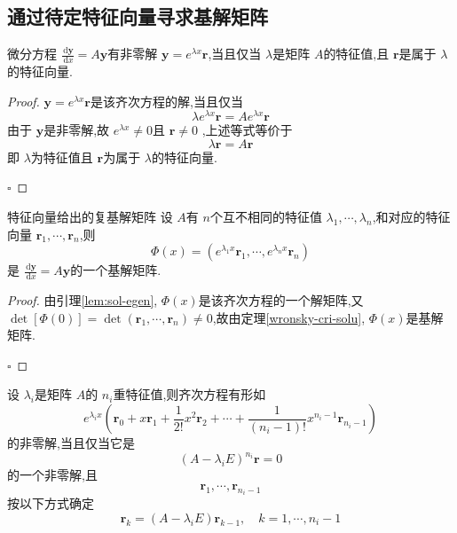 \documentclass[lang=cn,12pt,color=green,fontset=none]{elegantbook}
\begin{document}
\subsection{通过待定特征向量寻求基解矩阵}
 \begin{lemma}\label{lem:sol-egen}
    微分方程 $ \frac{\,\mathrm{d} \mathbf{y} }{\,\mathrm{d} x } = A \mathbf{y}  $有非零解 $ \mathbf{y}= e^{\lambda x} \mathbf{r} $,当且仅当 $ \lambda  $是矩阵 $ A $的特征值,且 $ \mathbf{r} $是属于 $ \lambda  $的特征向量.      
 \end{lemma}
 \begin{proof}
    $ \mathbf{y}= e^{\lambda x} \mathbf{r} $是该齐次方程的解,当且仅当 $$
    \lambda e^{\lambda x} \mathbf{r}= A e^{\lambda x} \mathbf{r}
    $$ 由于 $ \mathbf{y} $是非零解,故 $ e^{\lambda x} \neq  0 $且 $ \mathbf{r} \neq  0 $ ,上述等式等价于 $$
    \lambda \mathbf{r}  = A \mathbf{r}
    $$  即 $ \lambda  $为特征值且 $ \mathbf{r} $为属于 $ \lambda  $的特征向量.  
 
    \hfill $\square$
 \end{proof}

 \begin{theorem}{特征向量给出的复基解矩阵}
    设 $ A $有 $ n $个互不相同的特征值 $  \lambda _{1},\cdots , \lambda _{n} $,和对应的特征向量 $ \mathbf{r}_{1},\cdots ,\mathbf{r}_{n} $,则 $$
    \Phi \left( x \right) = \left( e^{ \lambda _{1}x} \mathbf{r}_{1},\cdots , e^{ \lambda _{n}x}\mathbf{r}_{n} \right)  
    $$是 $ \frac{\,\mathrm{d} \mathbf{y} }{ \,\mathrm{d} x} = A \mathbf{y}  $的一个基解矩阵.     
 \end{theorem}

 \begin{proof}
    由引理\ref{lem:sol-egen}, $ \Phi \left( x \right)  $是该齐次方程的一个解矩阵,又 $ \det [\Phi  \left( 0 \right) ] = \det \left( \mathbf{r}_{1},\cdots ,\mathbf{r}_{n} \right)  \neq 0$,故由定理\ref{wronsky-cri-solu}, $ \Phi \left( x \right)  $是基解矩阵.   
 
    \hfill $\square$
 \end{proof}

 
 \begin{lemma}\label{lem:gen-egv-sol}
    设 $  \lambda _{i} $是矩阵 $ A $的 $ n_{i} $重特征值,则齐次方程有形如
    \begin{equation}\label{gen-egv-sol}
        e^{ \lambda _{i}x}\left( \mathbf{r}_{0}+ x \mathbf{r}_{1}+  \frac{1}{2!} x^{2} \mathbf{r}_{2}+ \cdots +  \frac{1}{\left( n_{i}-1 \right)! } x^{n_{i}-1}\mathbf{r}_{n_{i}-1} \right) 
    \end{equation}
    的非零解,当且仅当它是 $$
    \left( A- \lambda _{i}E \right)^{n_{i}} \mathbf{r}=0
    $$的一个非零解,且 
    \begin{equation}
        \mathbf{r}_{1},\cdots ,\mathbf{r}_{n_{i}-1} 
    \end{equation} 
    按以下方式确定
    \begin{equation}
        \mathbf{r}_{k}=\left( A- \lambda _{i}E \right)\mathbf{r}_{k-1},\quad  k=1,\cdots ,n_{i}-1 
    \end{equation}
 \end{lemma}
\end{document}
